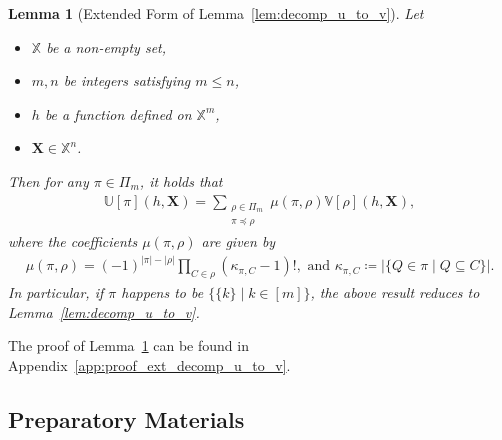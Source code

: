 \documentclass[sn-mathphys, natbib=false]{sn-jnl}
\theoremstyle{plain}
\newtheorem{lemma}{Lemma}
\theoremstyle{definition}
\newcommand{\sPi}{\pi}
\newcommand{\ustat}{\mathbb{U}}
\newcommand{\vstat}{\mathbb{V}}
\newcommand{\samplespace}{\bbX}
\newcommand{\partition}{\Pi}
\newcommand{\partitionp}[1]{\partition_{#1}}
\newcommand{\pleq}{\preceq}
\def\bbX{\mathbb{X}}
\begin{document}
\begin{bibunit}[agsm]
\begin{lemma}[Extended Form of Lemma~\ref{lem:decomp_u_to_v}]
\label{lem:ext_decomp_u_to_v}
    Let
    \begin{itemize}
        \item $\samplespace$ be a non-empty set,
        \item $m,n$ be integers satisfying $m \leq n$,
        \item $h$ be a function defined on $\samplespace^m$,
        \item $\bm{X} \in \samplespace^n$. 
    \end{itemize}
    Then for any $\sPi \in \partitionp{m}$, it holds that
    \begin{align*}
        \ustat[\sPi](h,\bm{X}) 
        = \sum_{\substack{ \rho \in \partitionp{m} \\ \sPi \pleq \rho }}  
        \mu(\sPi, \rho)  \vstat[\rho](h, \bm{X}),
    \end{align*}
    where the coefficients $\mu(\sPi, \rho)$ are given by
    \begin{align*}
        \mu(\sPi, \rho) 
        = (-1)^{|\sPi|-|\rho|} 
        \prod_{C \in \rho} (\kappa_{\sPi, C} - 1)!, \text{ and } \kappa_{\sPi, C} \coloneqq |\{ Q \in \sPi \mid Q \subseteq C \}|.
    \end{align*}
    In particular, if $\sPi$ happens to be $\{\{k\} \mid k \in [m]\}$, the above result reduces to Lemma~\ref{lem:decomp_u_to_v}. 
\end{lemma}

The proof of Lemma~\ref{lem:ext_decomp_u_to_v} can be found in Appendix~\ref{app:proof_ext_decomp_u_to_v}.

\subsection{Preparatory Materials}\label{app:preparatory_materials}


\end{bibunit}
\end{document}
